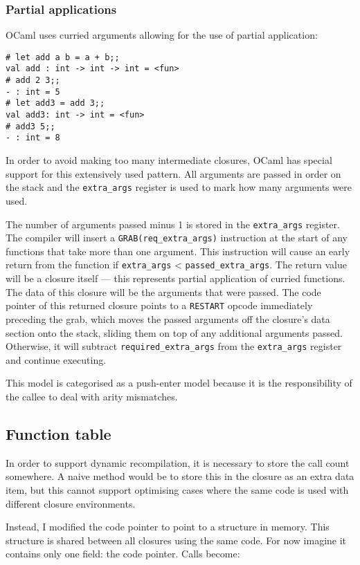 \subsubsection{Partial applications}

OCaml uses curried arguments allowing for the use of partial application:

\begin{verbatim}
# let add a b = a + b;;
val add : int -> int -> int = <fun>
# add 2 3;;
- : int = 5
# let add3 = add 3;;
val add3: int -> int = <fun>
# add3 5;;
- : int = 8
\end{verbatim}

In order to avoid making too many intermediate closures, OCaml has special support for this
extensively used pattern. All arguments are passed in order on the stack and the
\texttt{extra\_args}
register is used to mark how many arguments were used.

The number of arguments passed minus 1 is stored in the \texttt{extra\_args} register. The compiler
will insert a \texttt{GRAB(req\_extra\_args)} instruction at the start of any functions that take
more than one argument.  This instruction will cause an early return from the function if
\texttt{extra\_args} <
\texttt{passed\_extra\_args}. The return value will be a closure itself --- this represents partial
application of curried functions. The data of this closure will be the arguments that were passed.
The code pointer of this returned closure points to a \texttt{RESTART} opcode immediately
preceding the grab, which moves the passed arguments off  the closure's data section onto the
stack, sliding them on top of any additional arguments passed.	Otherwise, it will subtract
\texttt{required\_extra\_args} from the \texttt{extra\_args} register
and continue executing.

This model is categorised as a push-enter model because it is the responsibility of the callee to
deal with arity mismatches.

\subsection{Function table}

In order to support dynamic recompilation, it is necessary to store the call count somewhere. A
naive method would be to store this in the closure as an extra data item, but this cannot support
optimising cases where the same code is used with different closure environments.

Instead, I modified the code pointer to point to a structure in memory. This structure is shared
between all closures using the same code. For now imagine it contains only one field: the code
pointer. Calls become:

